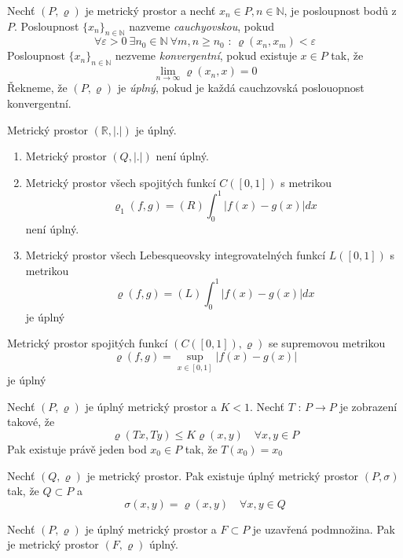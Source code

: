 \begin{definice}
Nechť $(P, \varrho)$ je metrický prostor a nechť $x_n \in P, n \in \mathbb{N}$, je posloupnost bodů z $P$. Posloupnost $\{ x_n \}_{n \in \mathbb{N}}$ nazveme \emph{cauchyovskou}, pokud
$$\forall \varepsilon > 0 \ \exists n_0 \in \mathbb{N} \ \forall m,n \geq n_0 \textrm{ : } \varrho(x_n, x_m) < \varepsilon$$
Posloupnost $\{ x_n \}_{n \in \mathbb{N}}$ nezveme \emph{konvergentní}, pokud existuje $x \in P$ tak, že
$$\lim_{n \rightarrow \infty} \varrho (x_n, x) = 0$$
Řekneme, že $(P, \varrho)$ je \emph{úplný}, pokud je každá cauchzovská poslouopnost konvergentní.
\end{definice}

\begin{vetal}
Metrický prostor $(\mathbb{R}, |.|)$ je úplný.
\end{vetal}

\begin{priklad}
\begin{enumerate}
\item Metrický prostor $(Q, |.|)$ není úplný.
\item Metrický prostor všech spojitých funkcí $C([0, 1])$ s metrikou
$$\varrho_1(f,g) = (R) \int_0^1 |f(x) - g(x)| dx$$
není úplný.
\item Metrický prostor všech Lebesqueovsky integrovatelných funkcí $L([0,1])$ s metrikou
$$\varrho(f,g) = (L) \int_0^1 |f(x)-g(x)|dx$$
je úplný
\end{enumerate}
\end{priklad}

\begin{vetat}
Metrický prostor spojitých funkcí $(C([0,1]), \varrho)$ se supremovou metrikou
$$\varrho(f,g) = \sup_{x \in [0,1]} |f(x) - g(x)|$$
je úplný
\end{vetat}

\begin{vetat}
Nechť $(P, \varrho)$ je úplný metrický prostor a $K < 1$. Nechť $T \textrm{ : } P \rightarrow P$ je zobrazení takové, že 
$$\varrho(Tx, Ty) \leq K \varrho(x,y) \quad \forall x,y \in P$$
Pak existuje právě jeden bod $x_0 \in P$ tak, že $T(x_0)=x_0$
\end{vetat}

\begin{vetat}
Nechť $(Q, \varrho)$ je metrický prostor. Pak existuje úplný metrický prostor $(P, \sigma)$ tak, že $Q \subset P$ a 
$$\sigma(x,y) = \varrho(x,y) \quad \forall x,y \in Q$$
\end{vetat}

\begin{vetal}
Nechť $(P, \varrho)$ je úplný metrický prostor a $F \subset P$ je uzavřená podmnožina. Pak je metrický prostor $(F, \varrho)$ úplný.
\end{vetal}